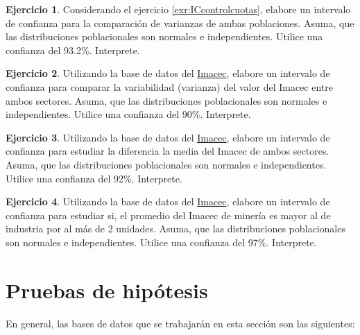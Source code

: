 \documentclass[
  11pt,
]{book}
\theoremstyle{definition}
\theoremstyle{definition}
\theoremstyle{definition}
\newtheorem{exercise}{Ejercicio}[chapter]
\theoremstyle{definition}
\theoremstyle{remark}
\begin{document}
\begin{exercise}
Considerando el ejercicio \ref{exr:ICcontrolcuotas}, elabore un intervalo de confianza para la comparación de varianzas de ambas poblaciones. Asuma, que las distribuciones poblacionales son normales e independientes. Utilice una confianza del 93.2\%. Interprete.
\end{exercise}

\begin{exercise}
Utilizando la base de datos del \hyperref[Imacec1]{Imacec}, elabore un intervalo de confianza para comparar la variabilidad (varianza) del valor del Imacec entre ambos sectores. Asuma, que las distribuciones poblacionales son normales e independientes. Utilice una confianza del 90\%. Interprete.
\end{exercise}

\begin{exercise}
Utilizando la base de datos del \hyperref[Imacec1]{Imacec}, elabore un intervalo de confianza para estudiar la diferencia la media del Imacec de ambos sectores. Asuma, que las distribuciones poblacionales son normales e independientes. Utilice una confianza del 92\%. Interprete.
\end{exercise}

\begin{exercise}
Utilizando la base de datos del \hyperref[Imacec1]{Imacec}, elabore un intervalo de confianza para estudiar si, el promedio del Imacec de minería es mayor al de industria por al más de 2 unidades. Asuma, que las distribuciones poblacionales son normales e independientes. Utilice una confianza del 97\%. Interprete.
\end{exercise}

\chapter{Pruebas de hipótesis}\label{PH}

En general, las bases de datos que se trabajarán en esta sección son las siguientes:
\end{document}
